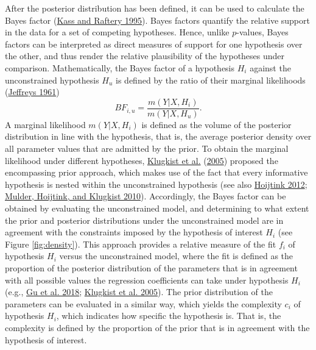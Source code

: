 \documentclass[
  11pt,
]{article}
\begin{document}
After the posterior distribution has been defined, it can be used to calculate the Bayes factor (\protect\hyperlink{ref-kass_raftery_bayes_factors_1995}{Kass and Raftery 1995}).
Bayes factors quantify the relative support in the data for a set of competing hypotheses.
Hence, unlike \(p\)-values, Bayes factors can be interpreted as direct measures of support for one hypothesis over the other, and thus render the relative plausibility of the hypotheses under comparison.
Mathematically, the Bayes factor of a hypothesis \(H_{i}\) against the unconstrained hypothesis \(H_{u}\) is defined by the ratio of their marginal likelihoods (\protect\hyperlink{ref-jeffreys_1961}{Jeffreys 1961})
\[
BF_{i,u} = \frac{m(Y | X, H_{i})}{m(Y|X, H_{u})}.
\]
A marginal likelihood \(m(Y|X, H_i)\) is defined as the volume of the posterior distribution in line with the hypothesis, that is, the average posterior density over all parameter values that are admitted by the prior.
To obtain the marginal likelihood under different hypotheses, \protect\hyperlink{ref-klugkist_inequality_2005}{Klugkist et al.} (\protect\hyperlink{ref-klugkist_inequality_2005}{2005}) proposed the encompassing prior approach, which makes use of the fact that every informative hypothesis is nested within the unconstrained hypothesis (see also \protect\hyperlink{ref-hoijtink_informative_2012}{Hoijtink 2012}; \protect\hyperlink{ref-mulder_equality_2010}{Mulder, Hoijtink, and Klugkist 2010}).
Accordingly, the Bayes factor can be obtained by evaluating the unconstrained model, and determining to what extent the prior and posterior distributions under the unconstrained model are in agreement with the constraints imposed by the hypothesis of interest \(H_i\) (see Figure \ref{fig:density}).
This approach provides a relative measure of the fit \(f_i\) of hypothesis \(H_i\) versus the unconstrained model, where the fit is defined as the proportion of the posterior distribution of the parameters that is in agreement with all possible values the regression coefficients can take under hypothesis \(H_i\) (e.g., \protect\hyperlink{ref-gu_approximated_2018}{Gu et al. 2018}; \protect\hyperlink{ref-klugkist_inequality_2005}{Klugkist et al. 2005}).
The prior distribution of the parameters can be evaluated in a similar way, which yields the complexity \(c_i\) of hypothesis \(H_i\), which indicates how specific the hypothesis is.
That is, the complexity is defined by the proportion of the prior that is in agreement with the hypothesis of interest.

\setlength{\parindent}{0.0in}
\setlength{\leftskip}{0.0in}
\end{document}
